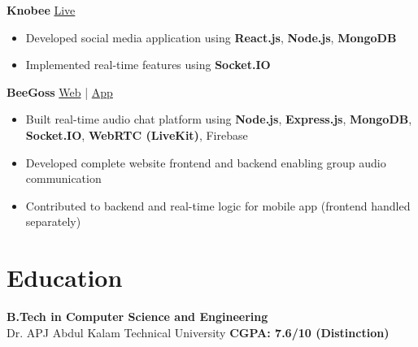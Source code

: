 \documentclass[letterpaper,11pt]{article}
\begin{document}
\textbf{Knobee} \hfill \href{https://knobee.app/}{Live}
\begin{itemize}
\item Developed social media application using \textbf{React.js}, \textbf{Node.js}, \textbf{MongoDB}
\item Implemented real-time features using \textbf{Socket.IO}
\end{itemize}

\textbf{BeeGoss} \hfill \href{https://beegoss.knobee.app/}{Web} \;|\; \href{https://play.google.com/store/apps/details?id=com.beegoss&hl=en_IN}{App}
\begin{itemize}
\item Built real-time audio chat platform using \textbf{Node.js}, \textbf{Express.js}, \textbf{MongoDB}, \textbf{Socket.IO}, \textbf{WebRTC (LiveKit)}, Firebase
\item Developed complete website frontend and backend enabling group audio communication
\item Contributed to backend and real-time logic for mobile app (frontend handled separately)
\end{itemize}

\section{Education}
\textbf{B.Tech in Computer Science and Engineering} \\
Dr. APJ Abdul Kalam Technical University \hfill \textbf{CGPA: 7.6/10 (Distinction)}
\end{document}
